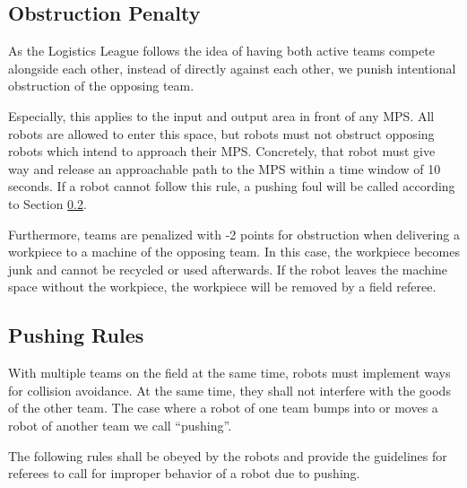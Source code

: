 \documentclass[12pt,twoside]{article}
\begin{document}
\subsection{Obstruction Penalty}
\label{sec:obstruction-penalty}

As the Logistics League follows the idea of having both active teams 
compete alongside each other, instead of directly against each other, we 
punish intentional obstruction of the opposing team.

Especially, this applies to the input and output area in front of any MPS. 
All robots are allowed to enter this space, but robots must not obstruct 
opposing robots which intend to approach their MPS. Concretely, that robot 
must give way and release an approachable path to the MPS within a time window 
of 10 seconds. If a robot cannot follow this rule, a pushing foul will 
be called according to Section \ref{sec:pushing-rules}.

Furthermore, teams are penalized with -2 points for obstruction when delivering a
workpiece to a machine of the opposing team.  In this case, the
workpiece becomes junk and cannot be recycled or used afterwards. If the
robot leaves the machine space without the workpiece, the workpiece will be
removed by a field referee.

\subsection{Pushing Rules}
\label{sec:pushing-rules}

With multiple teams on the field at the same time, robots must
implement ways for collision avoidance. At the same time, they shall
not interfere with the goods of the other team. The case where a robot
of one team bumps into or moves a robot of another team we
call ``pushing''.

The following rules shall be obeyed by the robots and provide the
guidelines for referees to call for improper behavior of a robot due
to pushing.
\end{document}
